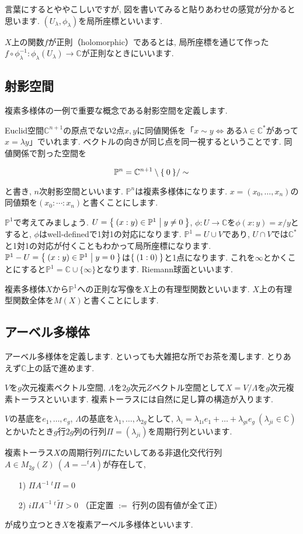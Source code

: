 \documentclass{jsarticle}
\newcommand{\CC}{\mathbb{C}}
\newcommand{\PP}{\mathbb{P}}
\theoremstyle{definition}
\numberwithin{theorem}{section}
\begin{document}
言葉にするとややこしいですが, 図を書いてみると貼りあわせの感覚が分かると思います. $(U_\lambda, \phi_\lambda)$を局所座標といいます.

$X$上の関数$f$が正則（holomorphic）であるとは, 局所座標を通じて作った$f\circ\phi_\lambda^{-1}: \phi_\lambda(U_\lambda) \rightarrow \CC$が正則なときにいいます.

\subsection{射影空間}
複素多様体の一例で重要な概念である射影空間を定義します.

Euclid空間$\CC^{n+1}$の原点でない2点$x, y$に同値関係を「$x\sim y\Leftrightarrow $ある$\lambda \in \CC^*$があって$x = \lambda y$」でいれます. ベクトルの向きが同じ点を同一視するということです. 同値関係で割った空間を

\[
\PP^n = \CC^{n+1}\setminus{\Set{0}} / \sim
\]

と書き, $n$次射影空間といいます. $\PP^n$は複素多様体になります. $x = (x_0, \ldots, x_n)$の同値類を$(x_0 : \cdots : x_n)$と書くことにします.

$\PP^1$で考えてみましょう. $U = \Set{(x:y) \in \PP^1 | y \neq 0}$, $\phi: U \rightarrow \CC$を$\phi(x:y) = x / y$とすると, $\phi$はwell-definedで1対1の対応になります. $\PP^1 = U\cup V$であり, $U\cap V$では$\CC^*$と1対1の対応が付くこともわかって局所座標になります. $\PP^1 - U = \Set{(x:y) \in \PP^1 | y = 0}$は$\Set{(1:0)}$と1点になります. これを$\infty$とかくことにすると$\PP^1 = \CC \cup \{\infty\}$となります. Riemann球面といいます.

複素多様体$X$から$\PP^1$への正則な写像を$X$上の有理型関数といいます. $X$上の有理型関数全体を$M(X)$と書くことにします.
\subsection{アーベル多様体}
アーベル多様体を定義します. といっても大雑把な所でお茶を濁します. とりあえず$\CC$上の話で進めます.

$V$を$g$次元複素ベクトル空間, $\Lambda$を$2g$次元$Z$ベクトル空間として$X = V/\Lambda$を$g$次元複素トーラスといいます. 複素トーラスには自然に足し算の構造が入ります.

$V$の基底を$e_1, \ldots, e_g$, $\Lambda$の基底を$\lambda_1, \ldots, \lambda_{2g}$として, $\lambda_i = \lambda_{1i}e_1 + \ldots + \lambda_{gi}e_g\ (\lambda_{ji} \in \CC)$とかいたとき$g$行$2g$列の行列$\Pi = (\lambda_{ji})$を周期行列といいます.

複素トーラス$X$の周期行列$\Pi$にたいしてある非退化交代行列$A \in M_{2g}(Z)\ (A = -^tA)$が存在して,
\begin{itemize}
\item[1)] $\Pi A^{-1}{\ }^t\Pi = 0$
\item[2)] $i \Pi A^{-1}{\ }^t\tilde\Pi > 0$ （正定置 $:=$ 行列の固有値が全て正）
\end{itemize}
が成り立つとき$X$を複素アーベル多様体といいます.
\end{document}
